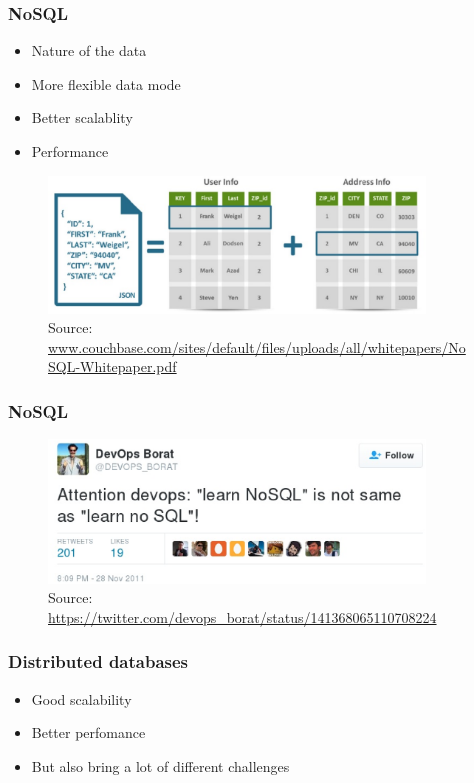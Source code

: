 \documentclass[10pt,utf8]{beamer}
\begin{document}
\begin{frame}
	\frametitle{NoSQL}
	\begin{itemize}
		\item Nature of the data
		\pause
		\item More flexible data mode
		\pause
		\item Better scalablity
		\pause
		\item Performance
	\end{itemize}
	\begin{figure}
		\centering
		\includegraphics[width=10cm]{./img/json_vs_sql.eps}
		\caption{\tiny{Source: \url{www.couchbase.com/sites/default/files/uploads/all/whitepapers/NoSQL-Whitepaper.pdf}}}
	\end{figure}
\end{frame}

\begin{frame}
	\frametitle{NoSQL}
		\begin{figure}
			\centering
			\includegraphics[width=10cm]{./img/borat_learn_nosql.eps}
			\caption{\tiny{Source: \url{https://twitter.com/devops_borat/status/141368065110708224}}}
		\end{figure}
\end{frame}

\begin{frame}
	\frametitle{Distributed databases}
	\begin{itemize}
		\item Good scalability
		\item Better perfomance
		\item But also bring a lot of different challenges
	\end{itemize}
\end{frame}
\end{document}
